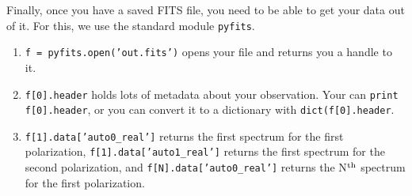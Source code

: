 \documentclass[psfig,preprint]{aastex}
\begin{document}
Finally, once you have a saved FITS file, you need to be able to get your data out of it.  For this,
we use the standard module {\tt pyfits}.
\begin{enumerate}
\item {\tt f = pyfits.open('out.fits')} opens your file and returns you a handle to it.
\item {\tt f[0].header} holds lots of metadata about your observation.  Your can {\tt print f[0].header},
or you can convert it to a dictionary with {\tt dict(f[0].header}.
\item {\tt f[1].data['auto0\_real']} returns the first spectrum for the first polarization, {\tt f[1].data['auto1\_real']} returns the first spectrum for the second polarization, and {\tt f[N].data['auto0\_real']} returns the N$^{\rm th}$
spectrum for the first polarization.
\end{enumerate}

\end{document}
